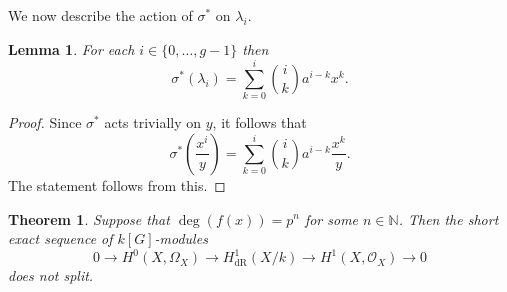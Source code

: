 \documentclass[draft, 11pt]{article} %
\theoremstyle{plain}
\newtheorem{thm}[defn]{Theorem}
\newtheorem{lem}[defn]{Lemma}
\theoremstyle{remark}
\newcommand{\ra}{\rightarrow}
\newcommand{\NN}{{\mathbb N}}
\newcommand{\hzero}{{H^0(X,\Omega_X)}}
\newcommand{\hone}{H^1(X,\mathcal{O}_X)}
\newcommand{\derhamhone}{H_{\text {dR}}^1(X/k)}
\begin{document}
We now describe the action of $\sigma^*$ on $\lambda_i$.
\begin{lem}
For each $i \in \{ 0, \ldots, g-1\}$ then 
\[
\sigma^*(\lambda_i) = \sum_{k = 0}^i \binom{i}{k}a^{i-k}x^k.
\]
\end{lem}
\begin{proof}
Since $\sigma^*$ acts trivially on $y$, it follows that
\[
\sigma^*\left( \frac{x^i}{y} \right) = \sum_{k=0}^i \binom{i}{k}a^{i-k}\frac{x^k}{y}.
\]
The statement follows from this.
\end{proof}


\begin{thm}
Suppose that $\deg(f(x)) = p^n $ for some $n \in \NN$.
Then the short exact sequence of $k[G]$-modules
\[
0 \ra \hzero \ra \derhamhone \ra \hone \ra 0
\]
does not split.
\end{thm}
\end{document}
